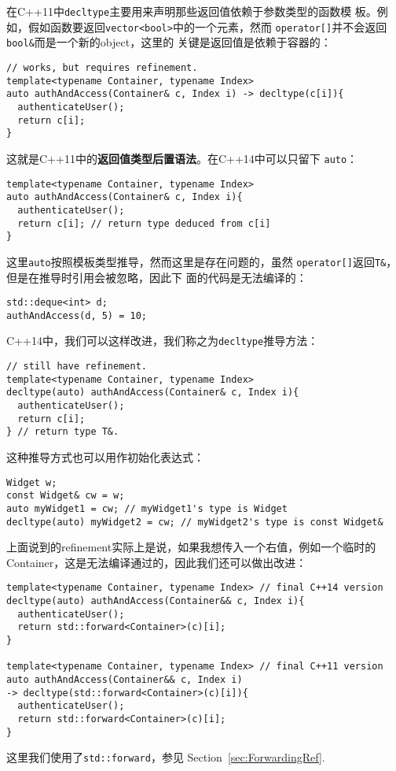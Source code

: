 在C++11中\texttt{decltype}主要用来声明那些返回值依赖于参数类型的函数模
板。例如，假如函数要返回\texttt{vector<bool>}中的一个元素，然而
\texttt{operator[]}并不会返回\texttt{bool\&}而是一个新的object，这里的
关键是返回值是依赖于容器的：
\begin{verbatim}
// works, but requires refinement.
template<typename Container, typename Index> 
auto authAndAccess(Container& c, Index i) -> decltype(c[i]){
  authenticateUser();
  return c[i];
}
\end{verbatim}
这就是C++11中的\textbf{返回值类型后置语法}。在C++14中可以只留下
\texttt{auto}：
\begin{verbatim}
template<typename Container, typename Index>
auto authAndAccess(Container& c, Index i){
  authenticateUser();
  return c[i]; // return type deduced from c[i]
}
\end{verbatim}

这里\texttt{auto}按照模板类型推导，然而这里是存在问题的，虽然
\texttt{operator[]}返回\texttt{T\&}，但是在推导时引用会被忽略，因此下
面的代码是无法编译的：
\begin{verbatim}
std::deque<int> d;
authAndAccess(d, 5) = 10; 
\end{verbatim}

C++14中，我们可以这样改进，我们称之为\texttt{decltype}推导方法：
\begin{verbatim}
// still have refinement.
template<typename Container, typename Index> 
decltype(auto) authAndAccess(Container& c, Index i){
  authenticateUser();
  return c[i];
} // return type T&.
\end{verbatim}

这种推导方式也可以用作初始化表达式：
\begin{verbatim}
Widget w;
const Widget& cw = w;
auto myWidget1 = cw; // myWidget1's type is Widget
decltype(auto) myWidget2 = cw; // myWidget2's type is const Widget&
\end{verbatim}

上面说到的refinement实际上是说，如果我想传入一个右值，例如一个临时的
Container，这是无法编译通过的，因此我们还可以做出改进：

\begin{verbatim}
template<typename Container, typename Index> // final C++14 version
decltype(auto) authAndAccess(Container&& c, Index i){
  authenticateUser();
  return std::forward<Container>(c)[i];
}

template<typename Container, typename Index> // final C++11 version
auto authAndAccess(Container&& c, Index i)
-> decltype(std::forward<Container>(c)[i]){
  authenticateUser();
  return std::forward<Container>(c)[i];
}
\end{verbatim}
这里我们使用了\texttt{std::forward}，参见
Section~\ref{sec:ForwardingRef}.

